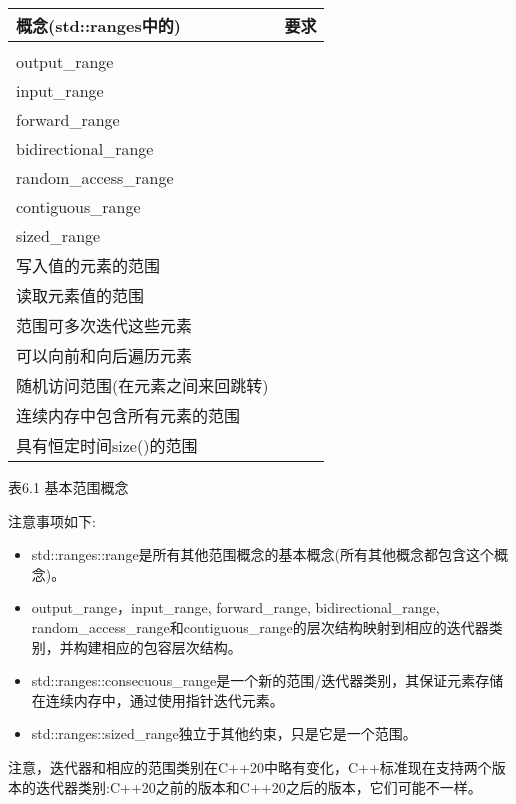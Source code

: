 \begin{longtable}[c]{|l|l|}
\hline
\textbf{概念(std::ranges中的)} &
\textbf{要求} \\ \hline
\endfirsthead
%
\endhead
%
\begin{tabular}[c]{@{}l@{}}range\\ output\_range\\ input\_range\\ forward\_range\\ bidirectional\_range\\ random\_access\_range\\ contiguous\_range\\ sized\_range\end{tabular} &
\begin{tabular}[c]{@{}l@{}}可以从头到尾迭代吗\\ 写入值的元素的范围\\ 读取元素值的范围\\ 范围可多次迭代这些元素\\ 可以向前和向后遍历元素\\ 随机访问范围(在元素之间来回跳转)\\ 连续内存中包含所有元素的范围\\ 具有恒定时间size()的范围\end{tabular} \\ \hline
\end{longtable}

\begin{center}
表6.1 基本范围概念
\end{center}

注意事项如下:

\begin{itemize}
\item
std::ranges::range是所有其他范围概念的基本概念(所有其他概念都包含这个概念)。

\item
output\_range，input\_range, forward\_range, bidirectional\_range, random\_access\_range和contiguous\_range的层次结构映射到相应的迭代器类别，并构建相应的包容层次结构。

\item
std::ranges::consecuous\_range是一个新的范围/迭代器类别，其保证元素存储在连续内存中，通过使用指针迭代元素。

\item
std::ranges::sized\_range独立于其他约束，只是它是一个范围。
\end{itemize}

注意，迭代器和相应的范围类别在C++20中略有变化，C++标准现在支持两个版本的迭代器类别:C++20之前的版本和C++20之后的版本，它们可能不一样。

